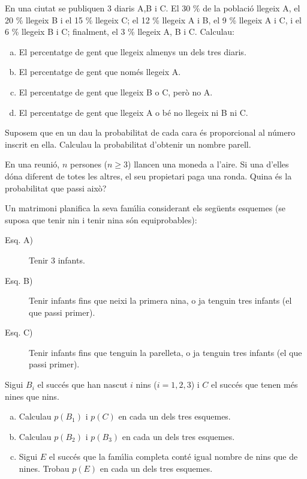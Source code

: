 \documentclass[12pt]{article}
\begin{document}
\probl  En una ciutat se publiquen 3 diaris A,B i C. El 30 \% de
la poblaci\'{o} llegeix A, el 20 \% llegeix B i el 15 \% llegeix C; el
12 \% llegeix A i B, el 9 \% llegeix A i C, i el 6 \% llegeix B i
C; finalment, el 3 \% llegeix A, B i C. Calculau:\
\begin{enumerate}[a)]
\item El percentatge de gent que llegeix almenys un dels tres diaris.

\item El percentatge de gent que nom\'{e}s llegeix A.
\item  El percentatge de gent que llegeix B o C, per\`{o} no A.

\item  El percentatge de gent que llegeix A o b\'{e} no llegeix ni B ni C.
\sol{ \bf{ a) 0.41 ; b) 0.12; c) 0.11; d) 0.89}}
\end{enumerate}

\probl  Suposem que en un dau la probabilitat de cada cara \'{e}s
proporcional al n\'{u}mero inscrit en ella. Calculau la probabilitat
d'obtenir un nombre parell. \sol{\bf 4/7}

\probl  En una reuni\'{o}, $n$ persones ($n \geq 3$) llancen una
moneda a l'aire. Si una d'elles d\'{o}na diferent de totes les altres,
el seu propietari paga una ronda. Quina \'{e}s la probabilitat que
passi aix\`{o}? 





\probl  
		Un matrimoni planifica la seva fam\'{\i}lia considerant els
		seg\"{u}ents esquemes (se suposa que tenir nin i tenir nina s\'{o}n
		equiprobables):
		\begin{description}
			\item[Esq. A)] Tenir 3 infants.
			\item[Esq. B)] Tenir infants fins que neixi la primera nina, o ja tenguin tres infants (el que passi primer).
			\item[Esq. C)] Tenir infants fins que tenguin la parelleta, o ja tenguin tres infants (el que passi primer).
		\end{description}
		Sigui $B_i$ el succ\'{e}s que han nascut $i$ nins ($i=1, 2, 3$) i $C$ el succ\'{e}s que tenen m\'{e}s nines que nins.
		\begin{enumerate}[a)]
			\item Calculau $p(B_1)$ i $p(C)$ en cada un dels tres esquemes.
			\item Calculau $p(B_2)$ i $p(B_3)$ en cada un dels tres esquemes.
			\item Sigui $E$ el succ\'{e}s que la fam\'{\i}lia completa cont\'{e} igual nombre de nins que de nines. Trobau $p(E)$ en cada un dels tres esquemes.
		\end{enumerate}
\end{document}
